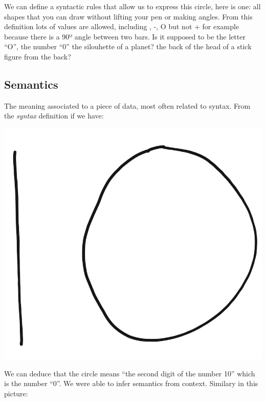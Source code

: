 \documentclass[
]{article}
\begin{document}
We can define a syntactic rules that allow us to express this circle,
here is one: all shapes that you can draw without lifting your pen or
making angles. From this definition lots of values are allowed,
including \textbar, -, O but not + for example because there is a 90º
angle between two bars. Is it supposed to be the letter ``O'', the
number ``0'' the silouhette of a planet? the back of the head of a stick
figure from the back?

\hypertarget{semantics-1}{%
\subsection{Semantics}\label{semantics-1}}

The meaning associated to a piece of data, most often related to syntax.
From the \emph{syntax} definition if we have:

\includegraphics{ten.jpg}

We can deduce that the circle means ``the second digit of the number
10'' which is the number ``0''. We were able to infer semantics from
context. Similary in this picture:
\end{document}
